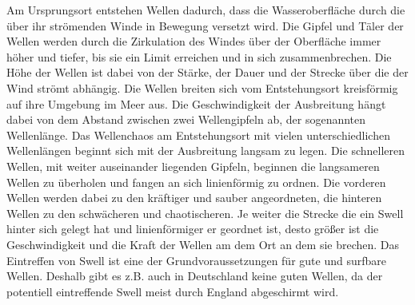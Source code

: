 Am Ursprungsort entstehen Wellen dadurch, dass die Wasseroberfläche
durch die über ihr strömenden Winde in Bewegung versetzt wird. Die
Gipfel und Täler der Wellen werden durch die Zirkulation des Windes
über der Oberfläche immer höher und tiefer, bis sie ein Limit
erreichen und in sich zusammenbrechen. Die Höhe der Wellen ist dabei
von der Stärke, der Dauer und der Strecke über die der Wind strömt
abhängig. Die Wellen breiten sich vom Entstehungsort kreisförmig auf
ihre Umgebung im Meer aus. Die Geschwindigkeit der Ausbreitung hängt
dabei von dem Abstand zwischen zwei Wellengipfeln ab, der sogenannten
Wellenlänge. Das Wellenchaos am Entstehungsort mit vielen
unterschiedlichen Wellenlängen beginnt sich mit der Ausbreitung
langsam zu legen. Die schnelleren Wellen, mit weiter auseinander
liegenden Gipfeln, beginnen die langsameren Wellen zu überholen und
fangen an sich linienförmig zu ordnen. Die vorderen Wellen werden
dabei zu den kräftiger und sauber angeordneten, die hinteren Wellen zu
den schwächeren und chaotischeren. Je weiter die Strecke die ein Swell
hinter sich gelegt hat und linienförmiger er geordnet ist, desto
größer ist die Geschwindigkeit und die Kraft der Wellen am dem Ort an
dem sie brechen. Das Eintreffen von Swell ist eine der
Grundvoraussetzungen für gute und surfbare Wellen. Deshalb gibt es
z.B. auch in Deutschland keine guten Wellen, da der potentiell
eintreffende Swell meist durch England abgeschirmt wird.

